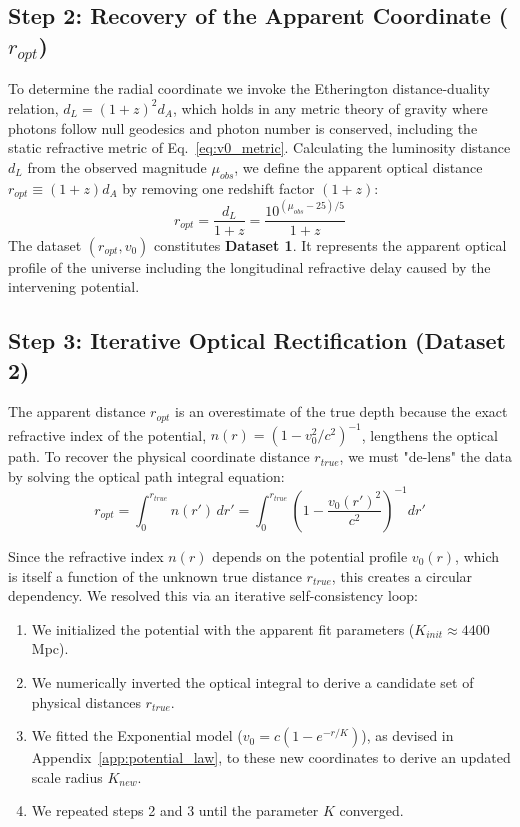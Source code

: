 \documentclass[11pt]{article}
\begin{document}
\subsection{Step 2: Recovery of the Apparent Coordinate ($r_{opt}$)}
To determine the radial coordinate we invoke the Etherington distance-duality relation, $d_L = (1+z)^2 d_A$, which holds in any metric theory of gravity where photons follow null geodesics and photon number is conserved, including the static refractive metric of Eq.~\ref{eq:v0_metric}. Calculating the luminosity distance $d_L$ from the observed magnitude $\mu_{obs}$, we define the apparent optical distance $r_{opt} \equiv (1+z)d_A$ by removing one redshift factor $(1+z)$:
\begin{equation}
    r_{opt} = \frac{d_L}{1 + z} = \frac{10^{(\mu_{obs} - 25)/5}}{1 + z}
\end{equation}
The dataset $(r_{opt}, v_0)$ constitutes \textbf{Dataset 1}. It represents the apparent optical profile of the universe including the longitudinal refractive delay caused by the intervening potential.

\subsection{Step 3: Iterative Optical Rectification (Dataset 2)}
The apparent distance $r_{opt}$ is an overestimate of the true depth because the exact refractive index of the potential, $n(r) = (1 - v_0^2/c^2)^{-1}$, lengthens the optical path. To recover the physical coordinate distance $r_{true}$, we must "de-lens" the data by solving the optical path integral equation:
\begin{equation}
    r_{opt} = \int_0^{r_{true}} n(r') \, dr' = \int_0^{r_{true}} \left( 1 - \frac{v_0(r')^2}{c^2} \right)^{-1} dr'
\end{equation}

Since the refractive index $n(r)$ depends on the potential profile $v_0(r)$, which is itself a function of the unknown true distance $r_{true}$, this creates a circular dependency. We resolved this via an iterative self-consistency loop:
\begin{enumerate}
    \item We initialized the potential with the apparent fit parameters ($K_{init} \approx 4400$ Mpc).
    \item We numerically inverted the optical integral to derive a candidate set of physical distances $r_{true}$.
    \item We fitted the Exponential model ($v_0 = c(1-e^{-r/K})$), as devised in Appendix~\ref{app:potential_law}, to these new coordinates to derive an updated scale radius $K_{new}$.
    \item We repeated steps 2 and 3 until the parameter $K$ converged.
\end{enumerate}
\end{document}

